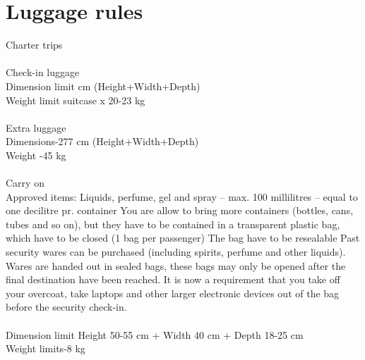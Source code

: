 \section{Luggage rules}
Charter trips\\
\\
Check-in luggage\\
Dimension limit\indent\indent{} cm (Height+Width+Depth)
\\
Weight limit\indent\indent\indent{} suitcase x 20-23 kg
\\
\\
Extra luggage\\
Dimensions\indent\indent\indent{}-277 cm (Height+Width+Depth)\\
Weight \indent\indent\indent \indent{}-45 kg
\\
\\
Carry on\\
Approved items: Liquids, perfume, gel and spray – max. 100 millilitres – equal to one decilitre pr. container
You are allow to bring more containers (bottles, cans, tubes and so on), but they have to be contained in a transparent plastic bag, which have to be closed (1 bag per passenger)
The bag have to be resealable
Past security wares can be purchased (including spirits, perfume and other liquids). Wares are handed out in sealed bags, these bags may only be opened after the final destination have been reached.
It is now a requirement that you take off your overcoat, take laptops and other larger electronic devices out of the bag before the security check-in.
\\
\\
Dimension limit \indent\indent\indent	Height 50-55 cm + Width 40 cm + Depth 18-25 cm
\\
Weight limits\indent\indent\indent{}-8 kg